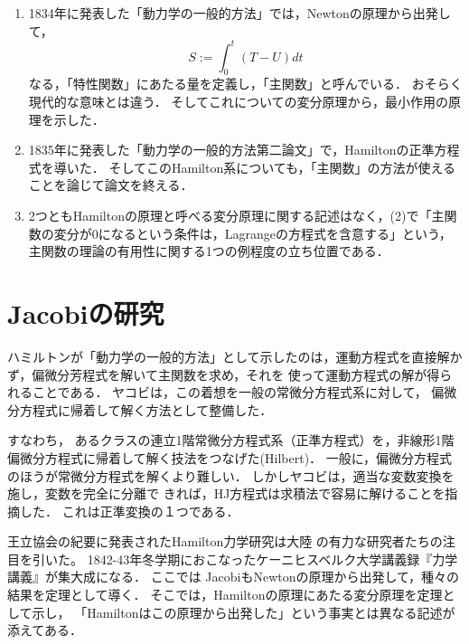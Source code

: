 \documentclass[uplatex, dvipdfmx]{jsreport}
\begin{document}
\begin{history}[力学への応用]\mbox{}
    \begin{enumerate}
        \item 1834年に発表した「動力学の一般的方法」\cite{Hamilton34}では，Newtonの原理から出発して，
        \[S:=\int^t_0(T-U)dt\]
        なる，「特性関数」にあたる量を定義し，「主関数」と呼んでいる．
        おそらく現代的な意味とは違う．
        そしてこれについての変分原理から，最小作用の原理を示した．
        \item 1835年に発表した「動力学の一般的方法第二論文」\cite{Hamilton35}で，Hamiltonの正準方程式を導いた．
        そしてこのHamilton系についても，「主関数」の方法が使えることを論じて論文を終える．
        \item 2つともHamiltonの原理と呼べる変分原理に関する記述はなく，(2)で「主関数の変分が$0$になるという条件は，Lagrangeの方程式を含意する」という，主関数の理論の有用性に関する1つの例程度の立ち位置である．
    \end{enumerate}
\end{history}

\section{Jacobiの研究}

\begin{tcolorbox}[colframe=ForestGreen, colback=ForestGreen!10!white,breakable,colbacktitle=ForestGreen!40!white,coltitle=black,fonttitle=\bfseries\sffamily,
title=]
    ハミルトンが「動力学の一般的方法」として示したのは，運動方程式を直接解かず，偏微分芳程式を解いて主関数を求め，それを
    使って運動方程式の解が得られることである．
    ヤコビは，この着想を一般の常微分方程式系に対して，
    偏微分方程式に帰着して解く方法として整備した．
    
    すなわち，
    あるクラスの連立1階常微分方程式系（正準方程式）を，非線形1階偏微分方程式に帰着して解く技法をつなげた(Hilbert\cite{Hilbert37})．
    一般に，偏微分方程式のほうが常微分方程式を解くより難しい．
    しかしヤコビは，適当な変数変換を施し，変数を完全に分離で
    きれば，HJ方程式は求積法で容易に解けることを指摘した．
    これは正準変換の１つである．
\end{tcolorbox}

\begin{history}
    王立協会の紀要に発表されたHamilton力学研究は大陸
    の有力な研究者たちの注目を引いた。
    1842-43年冬学期におこなったケーニヒスベルク大学講義録『力学講義』が集大成になる．
    ここでは
    JacobiもNewtonの原理から出発して，種々の結果を定理として導く．
    そこでは，Hamiltonの原理にあたる変分原理を定理として示し，
    「Hamiltonはこの原理から出発した」という事実とは異なる記述が添えてある．
\end{history}
\end{document}
